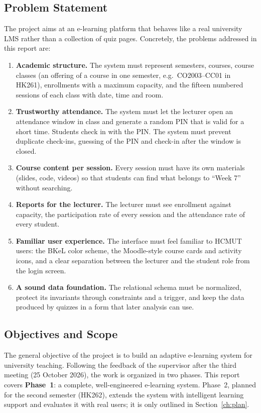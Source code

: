 \subsection{Problem Statement}

The project aims at an e-learning platform that behaves like a real university LMS rather than a collection of quiz pages. Concretely, the problems addressed in this report are:

\begin{enumerate}
    \item \textbf{Academic structure.} The system must represent semesters, courses, course classes (an offering of a course in one semester, e.g.\ CO2003--CC01 in HK261), enrollments with a maximum capacity, and the fifteen numbered sessions of each class with date, time and room.
    \item \textbf{Trustworthy attendance.} The system must let the lecturer open an attendance window in class and generate a random PIN that is valid for a short time. Students check in with the PIN. The system must prevent duplicate check-ins, guessing of the PIN and check-in after the window is closed.
    \item \textbf{Course content per session.} Every session must have its own materials (slides, code, videos) so that students can find what belongs to ``Week 7'' without searching.
    \item \textbf{Reports for the lecturer.} The lecturer must see enrollment against capacity, the participation rate of every session and the attendance rate of every student.
    \item \textbf{Familiar user experience.} The interface must feel familiar to HCMUT users: the BKeL color scheme, the Moodle-style course cards and activity icons, and a clear separation between the lecturer and the student role from the login screen.
    \item \textbf{A sound data foundation.} The relational schema must be normalized, protect its invariants through constraints and a trigger, and keep the data produced by quizzes in a form that later analysis can use.
\end{enumerate}

\subsection{Objectives and Scope}

The general objective of the project is to build an adaptive e-learning system for university teaching. Following the feedback of the supervisor after the third meeting (25 October 2026), the work is organized in two phases. This report covers \textbf{Phase~1}: a complete, well-engineered e-learning system. Phase~2, planned for the second semester (HK262), extends the system with intelligent learning support and evaluates it with real users; it is only outlined in Section~\ref{ch:plan}.


